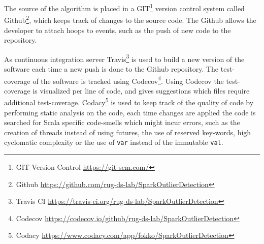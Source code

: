 The source of the algorithm is placed in a GIT\footnote{GIT Version Control \url{https://git-scm.com/}} version control system called Github\footnote{Github \url{https://github.com/rug-ds-lab/SparkOutlierDetection}}, which keeps track of changes to the source code. The Github allows the developer to attach hoops to events, such as the push of new code to the repository.

As continuous integration server Travis\footnote{Travis CI \url{https://travis-ci.org/rug-ds-lab/SparkOutlierDetection}} is used to build a new version of the software each time a new push is done to the Github repository. The test-coverage of the software is tracked using Codecov\footnote{Codecov \url{https://codecov.io/github/rug-ds-lab/SparkOutlierDetection}}. Using Codecov the test-coverage is visualized per line of code, and gives suggestions which files require additional test-coverage. 
Codacy\footnote{Codacy \url{https://www.codacy.com/app/fokko/SparkOutlierDetection}} is used to keep track of the quality of code by performing static analysis on the code, each time changes are applied the code is searched for Scala specific code-smells which might incur errors, such as the creation of threads instead of using futures, the use of reserved key-words, high cyclomatic complexity or the use of \texttt{var} instead of the immutable \texttt{val}. 
